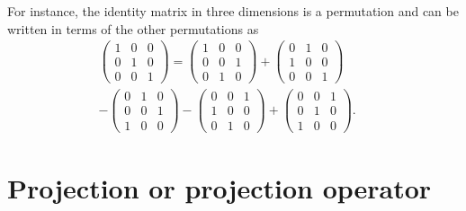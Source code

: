 {\color{blue}
\bexample
For instance, the identity matrix in three dimensions is a permutation
and can be written in terms of the other permutations as
\begin{equation}
\begin{split}
\begin{pmatrix}
1&0&0\\
0&1&0\\
0&0&1
\end{pmatrix}
=
\begin{pmatrix}
1&0&0\\
0&0&1\\
0&1&0
\end{pmatrix}
+
\begin{pmatrix}
0&1&0\\
1&0&0\\
0&0&1
\end{pmatrix}\qquad
\\
-
\begin{pmatrix}
0&1&0\\
0&0&1\\
1&0&0
\end{pmatrix}
-
\begin{pmatrix}
0&0&1\\
1&0&0\\
0&1&0
\end{pmatrix}
+
\begin{pmatrix}
0&0&1\\
0&1&0\\
1&0&0
\end{pmatrix}
.
\end{split}
\end{equation}
\eexample
}

\section{Projection or projection operator}
\label{2011-m-projec}


